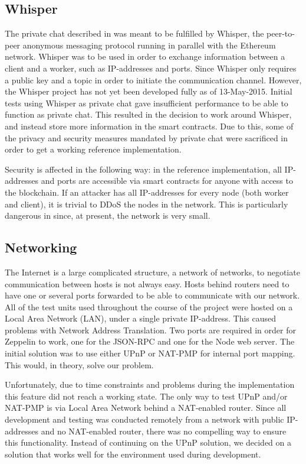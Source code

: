 \subsection{Whisper}
The private chat described in  was meant to be fulfilled by Whisper, the peer-to-peer anonymous messaging protocol running in parallel with the Ethereum network. Whisper was to be used in order to exchange information between a client and a worker, such as IP-addresses and ports. Since Whisper only requires a public key and a topic in order to initiate the communication channel. However, the Whisper project has not yet been developed fully as of 13-May-2015. Initial tests using Whisper as private chat gave insufficient performance to be able to function as private chat. This resulted in the decision to work around Whisper, and instead store more information in the smart contracts. Due to this, some of the privacy and security measures mandated by private chat were sacrificed in order to get a working reference implementation.

Security is affected in the following way: in the reference implementation, all IP-addresses and ports are accessible via smart contracts for anyone with access to the blockchain. If an attacker has all IP-addresses for every node (both worker and client), it is trivial to DDoS the nodes in the network. This is particularly dangerous in since, at present, the network is very small. 

\subsection{Networking}
The Internet is a large complicated structure, a network of networks, to negotiate communication between hosts is not always easy. Hosts behind routers need to have one or several ports forwarded to be able to communicate with our network. All of the test units used throughout the course of the project were hosted on a Local Area Network (LAN), under a single private IP-address. This caused problems with Network Address Translation. Two ports are required in order for Zeppelin to work, one for the JSON-RPC and one for the Node web server. The initial solution was to use either UPnP or NAT-PMP for internal port mapping. This would, in theory, solve our problem. 

Unfortunately, due to time constraints and problems during the implementation this feature did not reach a working state. The only way to test UPnP and/or NAT-PMP is via Local Area Network behind a NAT-enabled router. Since all development and testing was conducted remotely from a network with public IP-addresses and no NAT-enabled router, there was no compelling way to ensure this functionality. Instead of continuing on the UPnP solution, we decided on a solution that works well for the environment used during development.

